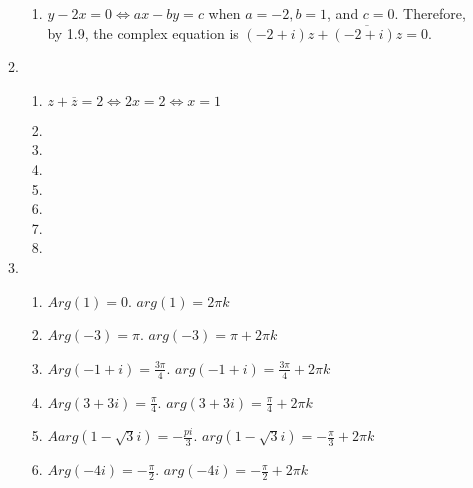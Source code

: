 \documentclass{article}%
\begin{document}
\begin{enumerate}
\begin{enumerate}[label*=\arabic*.]
\begin{enumerate}[label=\alph*]
            \item $y-2x=0 \Leftrightarrow ax-by=c$ when $a=-2, b=1$, and $c=0$. Therefore, by 1.9, the complex equation is $(-2+i)z+\overline{(-2+i)z}=0$.
        \end{enumerate}
        \item %
        \begin{enumerate}[label=\alph*]
            \item %
                $z+\overline{z}=2 \Leftrightarrow 2x=2 \Leftrightarrow x=1$
            \item %
            \item %
            \item %
            \item %
            \item %
            \item %
            \item %
        \end{enumerate}
        \item %
        \begin{enumerate}[label=\alph*]
            \item %
                $Arg(1) = 0$. $arg(1)=2\pi k$
            \item %
                $Arg(-3)=\pi$. $arg(-3)=\pi + 2\pi k$
            \item %
                $Arg(-1+i)=\frac{3\pi}{4}$. $arg(-1+i)=\frac{3\pi}{4}+2\pi k$
            \item %
                $Arg(3+3i)=\frac{\pi}{4}$. $arg(3+3i)=\frac{\pi}{4}+2\pi k$
            \item %
                $Aarg(1-\sqrt{3}i)=-\frac{pi}{3}$. $arg(1-\sqrt{3}i)=-\frac{\pi}{3}+2\pi k$
            \item %
                $Arg(-4i)=-\frac{\pi}{2}$. $arg(-4i)=-\frac{\pi}{2}+2\pi k$
       \end{enumerate}
    \end{enumerate}
\end{enumerate}
\end{document}
